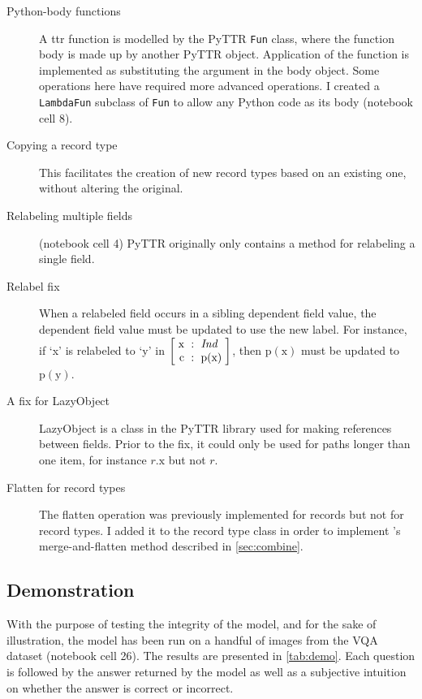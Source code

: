 \begin{description}
\item[Python-body functions] A \gls{ttr} function is modelled by the PyTTR \texttt{Fun} class, where the function body is made up by another PyTTR object.
Application of the function is implemented as substituting the argument in the body object.
Some operations here have required more advanced operations.
I created a \texttt{LambdaFun} subclass of \texttt{Fun} to allow any Python code as its body (notebook cell 8).
\item[Copying a record type] This facilitates the creation of new record types based on an existing one, without altering the original.
\item[Relabeling multiple fields] (notebook cell 4) PyTTR originally only contains a method for relabeling a single field.
\item[Relabel fix] When a relabeled field occurs in a sibling dependent field value, the dependent field value must be updated to use the new label.
	For instance, if `x' is relabeled to `y' in $\rec{\text{x} &:& \type{Ind} \\ \text{c} &:& \text{p}(\text{x})}$, then $\text{p}(\text{x})$ must be updated to $\text{p}(\text{y})$.
\item[A fix for LazyObject] LazyObject is a class in the PyTTR library used for making references between fields.
Prior to the fix, it could only be used for paths longer than one item, for instance $r.\text{x}$ but not $r$.
\item[Flatten for record types] The flatten operation was previously implemented for records but not for record types.
I added it to the record type class in order to implement \citeauthor{CooperTypetheorylanguage2016}'s merge-and-flatten method described in \autoref{sec:combine}.
\end{description}



\subsection{Demonstration}

With the purpose of testing the integrity of the model, and for the sake of illustration, the model has been run on a handful of images from the VQA dataset \citep{AgrawalVQAVisualQuestion2015} (notebook cell 26).
The results are presented in \autoref{tab:demo}.
Each question is followed by the answer returned by the model as well as a subjective intuition on whether the answer is correct or incorrect.

